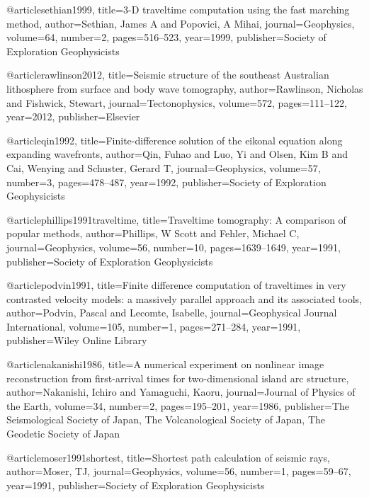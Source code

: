@article{sethian1999,
  title={3-D traveltime computation using the fast marching method},
  author={Sethian, James A and Popovici, A Mihai},
  journal={Geophysics},
  volume={64},
  number={2},
  pages={516--523},
  year={1999},
  publisher={Society of Exploration Geophysicists}
}

@article{rawlinson2012,
  title={Seismic structure of the southeast Australian lithosphere from surface and body wave tomography},
  author={Rawlinson, Nicholas and Fishwick, Stewart},
  journal={Tectonophysics},
  volume={572},
  pages={111--122},
  year={2012},
  publisher={Elsevier}
}

@article{qin1992,
  title={Finite-difference solution of the eikonal equation along expanding wavefronts},
  author={Qin, Fuhao and Luo, Yi and Olsen, Kim B and Cai, Wenying and Schuster, Gerard T},
  journal={Geophysics},
  volume={57},
  number={3},
  pages={478--487},
  year={1992},
  publisher={Society of Exploration Geophysicists}
}

@article{phillips1991traveltime,
  title={Traveltime tomography: A comparison of popular methods},
  author={Phillips, W Scott and Fehler, Michael C},
  journal={Geophysics},
  volume={56},
  number={10},
  pages={1639--1649},
  year={1991},
  publisher={Society of Exploration Geophysicists}
}

@article{podvin1991,
  title={Finite difference computation of traveltimes in very contrasted velocity models: a massively parallel approach and its associated tools},
  author={Podvin, Pascal and Lecomte, Isabelle},
  journal={Geophysical Journal International},
  volume={105},
  number={1},
  pages={271--284},
  year={1991},
  publisher={Wiley Online Library}
}






@article{nakanishi1986,
  title={A numerical experiment on nonlinear image reconstruction from first-arrival times for two-dimensional island arc structure},
  author={Nakanishi, Ichiro and Yamaguchi, Kaoru},
  journal={Journal of Physics of the Earth},
  volume={34},
  number={2},
  pages={195--201},
  year={1986},
  publisher={The Seismological Society of Japan, The Volcanological Society of Japan, The Geodetic Society of Japan}
}

@article{moser1991shortest,
  title={Shortest path calculation of seismic rays},
  author={Moser, TJ},
  journal={Geophysics},
  volume={56},
  number={1},
  pages={59--67},
  year={1991},
  publisher={Society of Exploration Geophysicists}
}



